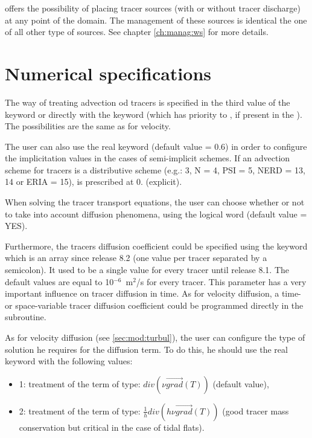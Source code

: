  offers the possibility of placing tracer sources
(with or without tracer discharge) at any point of the domain.
The management of these sources is identical the one of all other type of
sources.
See chapter \ref{ch:manag:ws} for more details.


\section{Numerical specifications}
\label{sec:num:spec}
The way of treating advection od tracers is specified in the third value
of the keyword  or directly with the keyword
 (which has priority to
, if present in the ).
The possibilities are the same as for velocity.

The user can also use the real keyword
 (default value = 0.6) in order to
configure the implicitation values in the cases of semi-implicit schemes.
If an advection scheme for tracers is a distributive scheme
(e.g.: 3, N = 4, PSI = 5, NERD = 13, 14 or ERIA = 15),
 is prescribed at 0. (explicit).

When solving the tracer transport equations, the user can choose
whether or not to take into account diffusion phenomena,
using the logical word 
(default value = YES).

Furthermore, the tracers diffusion coefficient could be specified using
the keyword  which is an
array since release 8.2 (one value per tracer separated by a semicolon).
It used to be a single value for every tracer until release 8.1.
The default values  are equal to 10$^{-6}$~m$^2$/s for every tracer.
This parameter has a very important influence on tracer diffusion in time.
As for velocity diffusion, a time- or space-variable tracer diffusion
coefficient could be programmed directly in the  subroutine.

As for velocity diffusion (see \ref{sec:mod:turbul}), the user can configure
the type of solution he requires for the diffusion term.
To do this, he should use the real keyword
 with the following values:

\begin{itemize}
\item 1: treatment of the term of type:
$div\left(\nu \overrightarrow{grad}\left(T\right)\right)$
(default value),

\item 2: treatment of the term of type:
$\frac{1}{h}div\left(h \nu \overrightarrow{grad}\left(T\right)\right)$
(good tracer mass conservation but critical in the case of tidal flats).
\end{itemize}


